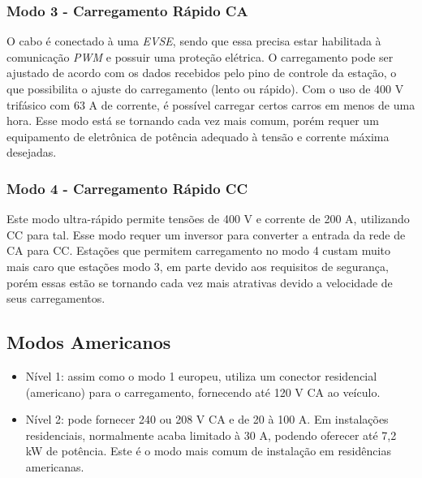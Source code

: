         \subsubsection{Modo 3 - Carregamento Rápido CA}
        \label{stateofart:modes:europe:mode3}

        O cabo é conectado à uma \textit{\ac{EVSE}}, sendo que essa precisa estar habilitada à comunicação \textit{\ac{PWM}} e possuir uma proteção elétrica. O carregamento pode ser ajustado de acordo com os dados recebidos pelo pino de controle da estação, o que possibilita o ajuste do carregamento (lento ou rápido). Com o uso de 400 V trifásico com 63 A de corrente, é possível carregar certos carros em menos de uma hora. Esse modo está se tornando cada vez mais comum, porém requer um equipamento de eletrônica de potência adequado à tensão e corrente máxima desejadas.

        \subsubsection{Modo 4 - Carregamento Rápido CC}
        \label{stateofart:modes:europe:mode4}

        Este modo ultra-rápido permite tensões de 400 V e corrente de 200 A, utilizando \ac{CC} para tal. Esse modo requer um inversor para converter a entrada da rede de \ac{CA} para \ac{CC}. Estações que permitem carregamento no modo 4 custam muito mais caro que estações modo 3, em parte devido aos requisitos de segurança, porém essas estão se tornando cada vez mais atrativas devido a velocidade de seus carregamentos.

    \subsection{Modos Americanos}
    \label{stateofart:modes:us}

      \begin{itemize}
        \item Nível 1: assim como o modo 1 europeu, utiliza um conector residencial (americano) para o carregamento, fornecendo até 120 V \ac{CA} ao veículo.
        \item Nível 2: pode fornecer 240 ou 208 V \ac{CA} e de 20 à 100 A. Em instalações residenciais, normalmente acaba limitado à 30 A, podendo oferecer até 7,2 kW de potência. Este é o modo mais comum de instalação em residências americanas.
      \end{itemize}

